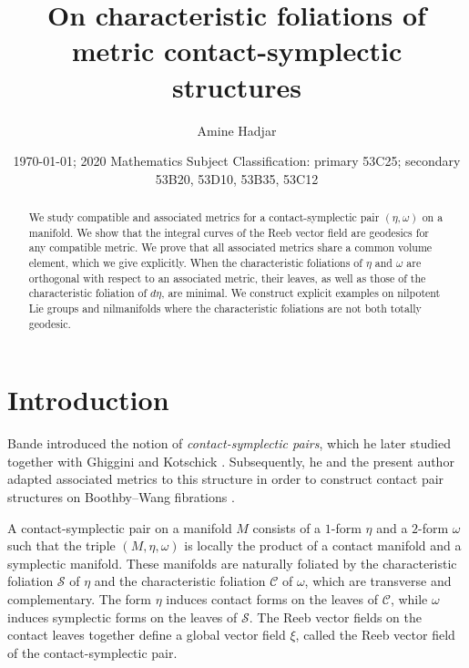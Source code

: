 \documentclass[12pt]{amsart}
\theoremstyle{definition}
\theoremstyle{remark}
\begin{document}
\title{On characteristic foliations of metric contact-symplectic structures}
\author{Amine Hadjar}
\address{%
D\'epartement de Math\'ematiques, IRIMAS, Universit{\'e} de Haute Alsace
, Rue des Fr{\`e}res Lumi{\`e}re, 68093 Mulhouse Cedex, France}

\date{\today; 2020 Mathematics Subject Classification: primary 53C25; secondary 53B20, 53D10, 53B35, 53C12}

\maketitle
\vspace{5mm}

\begin{abstract}
We study compatible and associated metrics for a contact-symplectic pair $(\eta , \omega)$ on a manifold.
We show that the integral curves of the Reeb vector field are geodesics for any compatible metric. 
We prove that all associated metrics share a common volume element, which we give explicitly.
When the characteristic foliations of $\eta$ and $\omega$ are orthogonal   with respect to an associated metric, their leaves, as well as those of the characteristic foliation of $d\eta$, are minimal. 
We construct explicit examples on nilpotent Lie groups and nilmanifolds where the characteristic foliations are not both totally geodesic.
\end{abstract}


\section{Introduction} 
Bande \cite{B}  introduced the notion of \emph{contact-symplectic pairs},
which he later studied together with Ghiggini and Kotschick \cite{  BGK, BKsp}.
Subsequently, he and the present author  adapted associated metrics to this structure in order to construct contact pair structures on Boothby--Wang fibrations \cite{BHnormal}.

\medskip 
\noindent
A contact-symplectic pair on a manifold $M$ consists of a $1$-form $\eta$ and a $2$-form $\omega$ such that the triple $(M,\eta,\omega)$ is locally the product of a contact manifold and a symplectic manifold.
These manifolds are naturally foliated by the characteristic foliation $\mathcal{S}$ of $\eta$ and the characteristic foliation $\mathcal{C}$ of $\omega$, which are transverse and complementary.
The form $\eta$ induces contact forms on the leaves of $\mathcal{C}$, while $\omega$ induces symplectic forms on the leaves of $\mathcal{S}$.
The Reeb vector fields on the contact leaves together define a global vector field $\xi$, called the Reeb vector field of the contact-symplectic pair.
\end{document}
